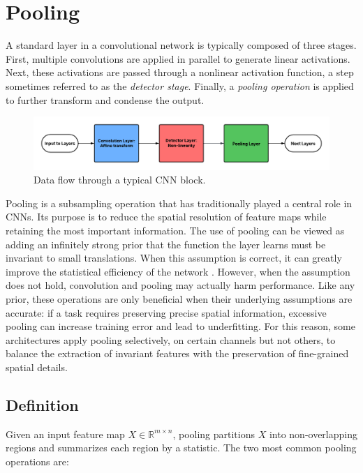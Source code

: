\chapter{Pooling}

A standard layer in a convolutional network is typically composed of three stages. First, multiple convolutions are applied in parallel to generate linear activations. Next, these activations are passed through a nonlinear activation function, a step sometimes referred to as the \textit{detector stage}. Finally, a \textit{pooling operation} is applied to further transform and condense the output.

\begin{figure}[H]
    \centering
    \includegraphics[width=0.7\linewidth]{Images/Chapters/layers.png}
    \caption{Data flow through a typical CNN block.}
    \label{fig:cnn_block_flow}
\end{figure}

Pooling is a subsampling operation that has traditionally played a central role in CNNs.  
Its purpose is to reduce the spatial resolution of feature maps while retaining the most important information. The use of pooling can be viewed as adding an inﬁnitely strong prior that the function the layer learns must be invariant to small translations. When this assumption is correct, it can greatly improve the statistical eﬃciency of the network \cite{goodfellow2016deep}.
However, when the assumption does not hold, convolution and pooling may actually harm performance. 
Like any prior, these operations are only beneficial when their underlying assumptions are accurate: if a task requires preserving precise spatial information, excessive pooling can increase training error and lead to underfitting. 
For this reason, some architectures apply pooling selectively, on certain channels but not others, to balance the extraction of invariant features with the preservation of fine-grained spatial details.

\section{Definition}

Given an input feature map $X \in \mathbb{R}^{m \times n}$, pooling partitions $X$ into non-overlapping regions and summarizes each region by a statistic.  
The two most common pooling operations are:  

